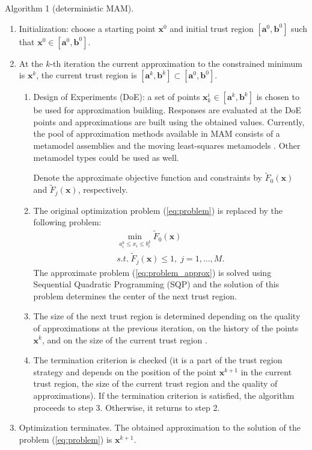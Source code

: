 \documentclass{llncs}
\begin{document}
Algorithm 1 (deterministic MAM).
\begin{enumerate}
\item Initialization: choose a starting point $\boldsymbol x^0$ and initial trust region $[\boldsymbol a^0, \boldsymbol b^0]$ such that $\boldsymbol x^0 \in [\boldsymbol a^0, \boldsymbol b^0]$.
\item At the $k$-th iteration the current approximation to the constrained minimum is $\boldsymbol x^k$, the current trust region is $[\boldsymbol a^k, \boldsymbol b^k] \subset [\boldsymbol a^0, \boldsymbol b^0]$.
  \begin{enumerate}[label=(\alph*)]
    \item Design of Experiments (DoE): a set of points $\boldsymbol x_k^i \in [\boldsymbol a^k, \boldsymbol b^k]$ is chosen to be used for approximation building. Responses are evaluated at the DoE points and approximations are built using the obtained values. Currently, the pool of approximation methods available in MAM consists of a metamodel assemblies \cite{PolynkinToropov2012} and the moving least-squares metamodels \cite{LancasterSalkauskas1981,Liszka1984,ChoiYounYang2001,ToropovSchrammSahaiJones2005}. Other metamodel types could be used as well.

    Denote the approximate objective function and constraints by $\widetilde{F}_0(\boldsymbol x)$ and $\widetilde{F}_j(\boldsymbol x)$, respectively.
    \item The original optimization problem (\ref{eq:problem}) is replaced by the following problem:
    \begin{equation}
      \label{eq:problem_approx}
      \begin{array}{c}
      \min\limits_{a_i^k \le x_i\le b_i^k}\widetilde{F}_0(\boldsymbol x) \\
      s.t.\; \widetilde{F}_j(\boldsymbol x) \le 1,\; j=1,\dots ,M.
      \end{array}
    \end{equation}
    The approximate problem (\ref{eq:problem_approx}) is solved using Sequential Quadratic Programming (SQP) and the solution of this problem determines the center of the next trust region.
    \item The size of the next trust region is determined depending on the quality of approximations at the previous iteration, on the history of the points $\boldsymbol x^k$, and on the size of the current trust region \cite{KeulenToropovMarkine1996}.
    \item The termination criterion is checked (it is a part of the trust region strategy and depends on the position of the point $\boldsymbol x^{k+1}$ in the current trust region, the size of the current trust region and the quality of approximations). If the termination criterion is satisfied, the algorithm proceeds to step 3. Otherwise, it returns to step 2.
  \end{enumerate}
  \item Optimization terminates. The obtained approximation to the solution of the problem (\ref{eq:problem}) is $\boldsymbol x^{k+1}$.
\end{enumerate}
\end{document}
